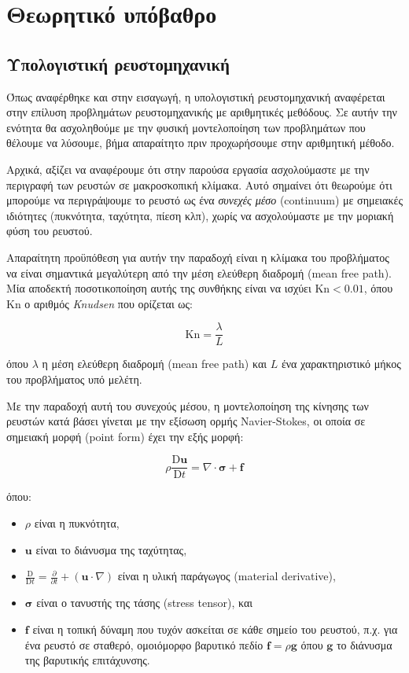 \chapter{Θεωρητικό υπόβαθρο}
\label{chapter:theory}

\section{Υπολογιστική ρευστομηχανική}

Όπως αναφέρθηκε και στην εισαγωγή, η υπολογιστική ρευστομηχανική αναφέρεται στην επίλυση προβλημάτων ρευστομηχανικής με αριθμητικές μεθόδους.
Σε αυτήν την ενότητα θα ασχοληθούμε με την φυσική μοντελοποίηση των προβλημάτων που θέλουμε να λύσουμε, βήμα απαραίτητο πριν προχωρήσουμε στην αριθμητική μέθοδο.

Αρχικά, αξίζει να αναφέρουμε ότι στην παρούσα εργασία ασχολούμαστε με την περιγραφή των ρευστών σε μακροσκοπική κλίμακα.
Αυτό σημαίνει ότι θεωρούμε ότι μπορούμε να περιγράψουμε το ρευστό ως ένα \emph{συνεχές μέσο} (continuum) με σημειακές ιδιότητες (πυκνότητα, ταχύτητα, πίεση κλπ), χωρίς να ασχολούμαστε με την μοριακή φύση του ρευστού.

Απαραίτητη προϋπόθεση για αυτήν την παραδοχή είναι η κλίμακα του προβλήματος να είναι σημαντικά μεγαλύτερη από την μέση ελεύθερη διαδρομή (mean free path).
Μία αποδεκτή ποσοτικοποίηση αυτής της συνθήκης είναι να ισχύει $\mathrm{Kn} < 0.01$, όπου $\mathrm{Kn}$ ο αριθμός \emph{Knudsen} που ορίζεται ως:

\begin{equation*}
    \mathrm{Kn} = \frac{\lambda}{L}
\end{equation*}

όπου $\lambda$ η μέση ελεύθερη διαδρομή (mean free path) και $L$ ένα χαρακτηριστικό μήκος του προβλήματος υπό μελέτη.

Με την παραδοχή αυτή του συνεχούς μέσου, η μοντελοποίηση της κίνησης των ρευστών κατά βάσει γίνεται με την εξίσωση ορμής Navier-Stokes, οι οποία σε σημειακή μορφή (point form) έχει την εξής μορφή:

\begin{equation}
    \rho \frac{\mathrm{D} \mathbf{u}}{\mathrm{D}t} = \nabla \cdot \mathbf{\sigma} + \mathbf{f}
    \label{eq:cauchy}
\end{equation}

όπου:

\begin{itemize}
    \item $\rho$ είναι η πυκνότητα,
    \item $\mathbf{u}$ είναι το διάνυσμα της ταχύτητας,
    \item $\frac{\mathrm{D}}{\mathrm{D}t} = \frac{\partial}{\partial t} + (\mathbf{u} \cdot \nabla )$ είναι η υλική παράγωγος (material derivative),
    \item $\mathbf{\sigma}$ είναι ο τανυστής της τάσης (stress tensor), και
    \item $\mathbf{f}$ είναι η τοπική δύναμη που τυχόν ασκείται σε κάθε σημείο του ρευστού, π.χ. για ένα ρευστό σε σταθερό, ομοιόμορφο βαρυτικό πεδίο $\mathbf{f} = \rho \mathbf{g}$ όπου $\mathbf{g}$ το διάνυσμα της βαρυτικής επιτάχυνσης.
\end{itemize}

